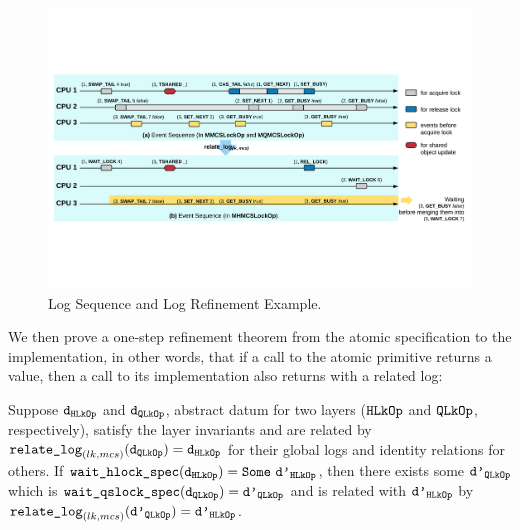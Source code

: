 \begin{figure}
\includegraphics[width=\textwidth]{figs/mcslock/logsequence}
\caption{Log Sequence and Log Refinement Example.}
\label{fig:chapter:mcslock:logsequence}
\end{figure}

We then prove a one-step refinement theorem from the atomic specification 
to the implementation, in other words, that if a call to the atomic primitive returns a 
value, then a call to its implementation also returns with a related log:

\begin{theorem}
  \label{thm:chapter:mcslock:mcs_wait_lock_exist}

  Suppose ${\mathrm{\texttt{d}}}_{{\mathrm{\texttt{HLkOp}}}}$ and ${\mathrm{\texttt{d}}}_{{\mathrm{\texttt{QLkOp}}}}$, abstract datum for two layers (${\mathrm{\texttt{HLkOp}}}$ and ${\mathrm{\texttt{QLkOp}}}$, respectively),
   satisfy the layer
  invariants and are related by
   ${\mathrm{\texttt{relate\_log}}}_{(lk, mcs)}({{\mathrm{\texttt{d}}}_{{\mathrm{\texttt{QLkOp}}}}}) = {{\mathrm{\texttt{d}}}_{{\mathrm{\texttt{HLkOp}}}}}$ for their global logs and identity relations for others.
If ${\mathrm{\texttt{wait\_hlock\_spec}}}({\mathrm{\texttt{d}}}_{{\mathrm{\texttt{HLkOp}}}}) = {\mathrm{\texttt{Some}}}\ {\mathrm{\texttt{d'}}}_{{\mathrm{\texttt{HLkOp}}}}$, then there exists some 
${\mathrm{\texttt{d'}}}_{{\mathrm{\texttt{QLkOp}}}}$
  which is ${\mathrm{\texttt{wait\_qslock\_spec}}}({\mathrm{\texttt{d}}}_{{\mathrm{\texttt{QLkOp}}}}) = {\mathrm{\texttt{d'}}}_{{\mathrm{\texttt{QLkOp}}}}$ and is related with ${\mathrm{\texttt{d'}}}_{{\mathrm{\texttt{HLkOp}}}}$  by
   ${\mathrm{\texttt{relate\_log}}}_{(lk, mcs)}({{\mathrm{\texttt{d'}}}_{{\mathrm{\texttt{QLkOp}}}}}) = {{\mathrm{\texttt{d'}}}_{{\mathrm{\texttt{HLkOp}}}}}$.
\end{theorem}

